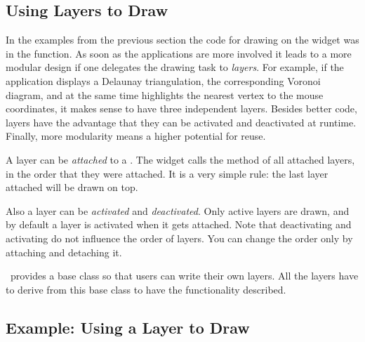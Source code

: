 \subsection{Using Layers to Draw}

In the examples from the previous section the code for drawing on the
widget was in the  function. As soon as the
applications are more involved it leads to a more modular design if
one delegates the drawing task to {\em layers}. For example, if the
application displays a Delaunay triangulation, the corresponding
Voronoi diagram, and at the same time highlights the nearest vertex to
the mouse coordinates, it makes sense to have three independent
layers. Besides better code, layers have the advantage that they can
be activated and deactivated at runtime. Finally, more modularity
means a higher potential for reuse.

A layer can be {\em attached} to a . The widget calls
the method  of all attached layers, in the
order that they were attached. It is a very simple rule: the last layer
attached will be drawn on top.

Also a layer can be {\em activated} and {\em deactivated}. Only active
layers are drawn, and by default a layer is activated when it gets
attached.  Note that deactivating and activating do not influence the
order of layers. You can change the order only by attaching and
detaching it.


\cgal\ provides a base class so that users can write their own
layers. All the layers have to derive from this base class
 to have the functionality described.


\subsection{Example: Using a Layer to Draw}

